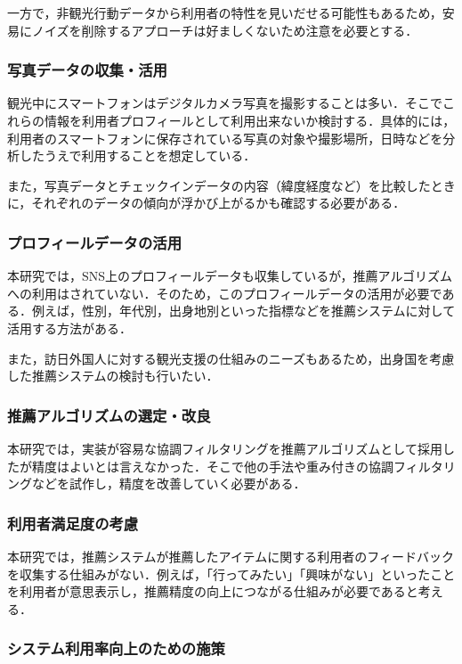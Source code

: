 \documentclass{jsarticle}
\begin{document}
一方で，非観光行動データから利用者の特性を見いだせる可能性もあるため，安易にノイズを削除するアプローチは好ましくないため注意を必要とする．

\subsubsection{写真データの収集・活用}

観光中にスマートフォンはデジタルカメラ写真を撮影することは多い．そこでこれらの情報を利用者プロフィールとして利用出来ないか検討する．具体的には，利用者のスマートフォンに保存されている写真の対象や撮影場所，日時などを分析したうえで利用することを想定している．

また，写真データとチェックインデータの内容（緯度経度など）を比較したときに，それぞれのデータの傾向が浮かび上がるかも確認する必要がある．

\subsubsection{プロフィールデータの活用}

本研究では，SNS上のプロフィールデータも収集しているが，推薦アルゴリズムへの利用はされていない．そのため，このプロフィールデータの活用が必要である．例えば，性別，年代別，出身地別といった指標などを推薦システムに対して活用する方法がある．

また，訪日外国人に対する観光支援の仕組みのニーズもあるため，出身国を考慮した推薦システムの検討も行いたい．

\subsubsection{推薦アルゴリズムの選定・改良}

本研究では，実装が容易な協調フィルタリングを推薦アルゴリズムとして採用したが精度はよいとは言えなかった．そこで他の手法や重み付きの協調フィルタリングなどを試作し，精度を改善していく必要がある．

\subsubsection{利用者満足度の考慮}

本研究では，推薦システムが推薦したアイテムに関する利用者のフィードバックを収集する仕組みがない．例えば，「行ってみたい」「興味がない」といったことを利用者が意思表示し，推薦精度の向上につながる仕組みが必要であると考える．

\subsubsection{システム利用率向上のための施策}
\end{document}
